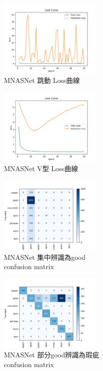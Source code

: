 %
\begin{figure}[H]
    \centering
    \includegraphics[width=0.45\textwidth]{./img/MNASNet/P1.png}
    \caption{MNASNet 跳動 Loss曲線}
    \label{fig:MNASNet_P1}
\end{figure}
\begin{figure}[H]
    \centering
    \includegraphics[width=0.45\textwidth]{./img/MNASNet/P2.png}
    \caption{MNASNet V型 Loss曲線}
    \label{fig:MNASNet_P2}
\end{figure}
\begin{figure}[H]
    \centering
    \includegraphics[width=0.45\textwidth]{./img/MNASNet/P3.png}
    \caption{MNASNet 集中辨識為good\protect\\
    confusion matrix}
    \label{fig:MNASNet_P3}
\end{figure}
\begin{figure}[H]
    \centering
    \includegraphics[width=0.45\textwidth]{./img/MNASNet/P4.png}
    \caption{MNASNet 部分good辨識為瑕疵\protect\\
             confusion matrix}
    \label{fig:MNASNet_P4}
\end{figure}
